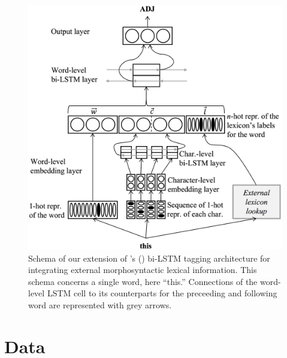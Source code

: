 \documentclass[11pt,letterpaper]{article}
\begin{document}
\begin{figure}
\includegraphics[width=\columnwidth]{emnlp17schemaB2}
\caption{Schema of our extension of \citeauthor{plank16}'s (\citeyear{plank16})
  bi-LSTM tagging architecture for integrating external morphosyntactic lexical information. This schema concerns a
  single word, here ``this.'' Connections of the word-level LSTM cell to its counterparts for the preceeding and
  following word are represented with grey arrows.}\label{fig:schema}
\end{figure}


\section{Data}
\end{document}

